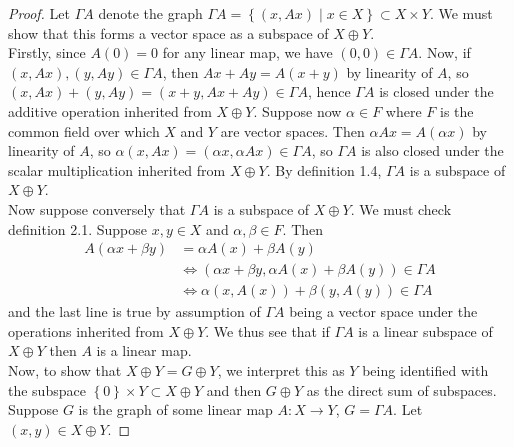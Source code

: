\documentclass[reqno]{amsart}
\theoremstyle{definition}
\theoremstyle{remark}
\begin{document}
\begin{proof}
    Let $\Gamma A$ denote the graph
    $\Gamma A = \left\{ \left( x,Ax \right)  \mid 
    x \in X\right\}  \subset X \times Y$.
    We must show that this forms a vector space as a
    subspace of $X \oplus Y$.\\
    Firstly, since $A(0) = 0$ for any linear map, we have
    $\left( 0,0 \right) \in \Gamma A$.
    Now, if $\left( x, Ax \right) , (y,Ay)
    \in \Gamma A$, then
    $Ax + Ay = A(x+y)$ by linearity of $A$, so
    $\left( x,Ax \right) + 
    \left( y,Ay \right) = 
    \left( x+y, Ax + Ay \right) \in \Gamma A$, hence
    $\Gamma A$ is closed under the additive operation
    inherited from $X \oplus Y$. Suppose
    now $\alpha \in F$ where $F$ is the common field over
    which $X$ and $Y$ are vector spaces.
    Then $\alpha Ax = 
    A(\alpha x)$ by linearity of $A$, so
    $ \alpha \left( x,
    Ax \right)  = \left( \alpha x, \alpha Ax \right) 
    \in \Gamma A$, so
    $\Gamma A$ is also closed under the scalar multiplication
    inherited from $X \oplus Y$. By definition 1.4,
    $\Gamma A$ is a subspace of $X \oplus Y$.\\
    \linebreak
    Now suppose conversely that
    $\Gamma A$ is a subspace of $X \oplus Y$. We
    must check definition 2.1.
    Suppose $x,y \in X$ and $\alpha,\beta \in F$.
    Then
    \begin{align*}
        A \left( \alpha x + \beta y \right) 
        &= \alpha A(x) + \beta A(y)\\
        &\iff \left( \alpha x + \beta y, 
        \alpha A(x) + \beta A(y) \right) \in \Gamma A\\
        &\iff \alpha \left( x, A(x) \right) +
        \beta \left( y, A(y) \right) \in \Gamma A
    \end{align*}
    and the last line is true by assumption of
    $\Gamma A$ being a vector space under the
    operations inherited from $X \oplus Y$.
    We thus see that if $\Gamma A$ is a linear subspace
    of $X \oplus Y$ then $A$ is a linear map.\\
    \linebreak
    Now, to show
    that $X \oplus Y = G \oplus Y$, we interpret this as
    $Y$ being identified with the subspace
    $\left\{ 0 \right\} \times Y \subset X \oplus Y$ and
    then $G \oplus Y$ as the direct sum of subspaces.\\
    Suppose $G$ is the graph of some linear map
    $A \colon X \to Y$, $G = \Gamma A$. 
    Let $\left( x,y \right) \in X \oplus Y$.

\end{proof}
\end{document}
